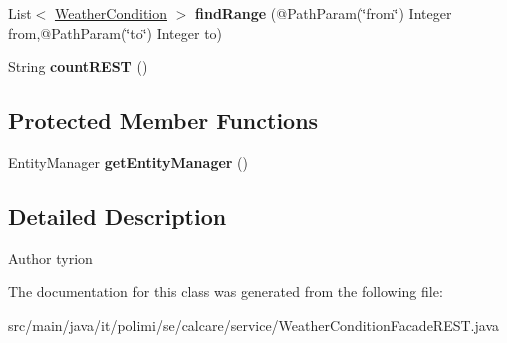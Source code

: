 \begin{DoxyCompactItemize}
\item 
\hypertarget{classit_1_1polimi_1_1se_1_1calcare_1_1service_1_1WeatherConditionFacadeREST_a68f643443b9a89e89d459c4539c9fb10}{}List$<$ \hyperlink{classit_1_1polimi_1_1se_1_1calcare_1_1entities_1_1WeatherCondition}{Weather\+Condition} $>$ {\bfseries find\+Range} (@Path\+Param(\char`\"{}from\char`\"{}) Integer from,@Path\+Param(\char`\"{}to\char`\"{}) Integer to)\label{classit_1_1polimi_1_1se_1_1calcare_1_1service_1_1WeatherConditionFacadeREST_a68f643443b9a89e89d459c4539c9fb10}

\item 
\hypertarget{classit_1_1polimi_1_1se_1_1calcare_1_1service_1_1WeatherConditionFacadeREST_a6bb840c228acac6e2967d6818e4d154a}{}String {\bfseries count\+R\+E\+S\+T} ()\label{classit_1_1polimi_1_1se_1_1calcare_1_1service_1_1WeatherConditionFacadeREST_a6bb840c228acac6e2967d6818e4d154a}

\end{DoxyCompactItemize}
\subsection*{Protected Member Functions}
\begin{DoxyCompactItemize}
\item 
\hypertarget{classit_1_1polimi_1_1se_1_1calcare_1_1service_1_1WeatherConditionFacadeREST_a3f662ba0d4eac5eb7698e0662abd0095}{}Entity\+Manager {\bfseries get\+Entity\+Manager} ()\label{classit_1_1polimi_1_1se_1_1calcare_1_1service_1_1WeatherConditionFacadeREST_a3f662ba0d4eac5eb7698e0662abd0095}

\end{DoxyCompactItemize}


\subsection{Detailed Description}
\begin{DoxyAuthor}{Author}
tyrion 
\end{DoxyAuthor}


The documentation for this class was generated from the following file\+:\begin{DoxyCompactItemize}
\item 
src/main/java/it/polimi/se/calcare/service/Weather\+Condition\+Facade\+R\+E\+S\+T.\+java\end{DoxyCompactItemize}
